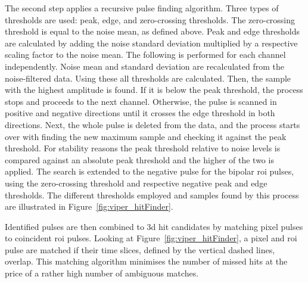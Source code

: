 The second step applies a recursive pulse finding algorithm.
Three types of thresholds are used: peak, edge, and zero-crossing thresholds.
The zero-crossing threshold is equal to the noise mean, as defined above.
Peak and edge thresholds are calculated by adding the noise standard deviation multiplied by a respective scaling factor to the noise mean.
The following is performed for each channel independently.
Noise mean and standard deviation are recalculated from the noise-filtered data.
Using these all thresholds are calculated.
Then, the sample with the highest amplitude is found.
If it is below the peak threshold, the process stops and proceeds to the next channel.
Otherwise, the pulse is scanned in positive and negative directions until it crosses the edge threshold in both directions.
Next, the whole pulse is deleted from the data, and the process starts over with finding the new maximum sample and checking it against the peak threshold.
For stability reasons the peak threshold relative to noise levels is compared against an absolute peak threshold and the higher of the two is applied.
The search is extended to the negative pulse for the bipolar \gls{roi} pulses, using the zero-crossing threshold and respective negative peak and edge thresholds.
The different thresholds employed and samples found by this process are illustrated in Figure~\ref{fig:viper_hitFinder}.

Identified pulses are then combined to \gls{3d} hit candidates by matching pixel pulses to coincident \gls{roi} pulses.
Looking at Figure~\ref{fig:viper_hitFinder}, a pixel and \gls{roi} pulse are matched if their time slices, defined by the vertical dashed lines, overlap.
This matching algorithm minimises the number of missed hits at the price of a rather high number of ambiguous matches.


